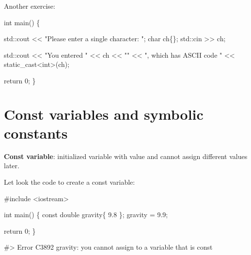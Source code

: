 \documentclass[
  letterpaper,
  DIV=11,
  numbers=noendperiod]{scrreprt}
\newenvironment{Shaded}{\begin{snugshade}}{\end{snugshade}}
\newcommand{\CommentTok}[1]{\textcolor[rgb]{0.37,0.37,0.37}{#1}}
\newcommand{\DecValTok}[1]{\textcolor[rgb]{0.68,0.00,0.00}{#1}}
\newcommand{\ErrorTok}[1]{\textcolor[rgb]{0.68,0.00,0.00}{#1}}
\newcommand{\FloatTok}[1]{\textcolor[rgb]{0.68,0.00,0.00}{#1}}
\newcommand{\FunctionTok}[1]{\textcolor[rgb]{0.28,0.35,0.67}{#1}}
\newcommand{\NormalTok}[1]{\textcolor[rgb]{0.00,0.23,0.31}{#1}}
\newcommand{\OtherTok}[1]{\textcolor[rgb]{0.00,0.23,0.31}{#1}}
\newcommand{\SpecialCharTok}[1]{\textcolor[rgb]{0.37,0.37,0.37}{#1}}
\newcommand{\StringTok}[1]{\textcolor[rgb]{0.13,0.47,0.30}{#1}}
\begin{document}
Another exercise:

\begin{Shaded}
\begin{Highlighting}[]
\NormalTok{int }\FunctionTok{main}\NormalTok{() \{}
    
\NormalTok{    std}\SpecialCharTok{::}\NormalTok{cout }\SpecialCharTok{\textless{}}\ErrorTok{\textless{}} \StringTok{"Please enter a single character: "}\NormalTok{;}
\NormalTok{    char ch\{\};}
\NormalTok{    std}\SpecialCharTok{::}\NormalTok{cin }\SpecialCharTok{\textgreater{}}\ErrorTok{\textgreater{}}\NormalTok{ ch;}

\NormalTok{    std}\SpecialCharTok{::}\NormalTok{cout }\SpecialCharTok{\textless{}}\ErrorTok{\textless{}} \StringTok{"You entered \textquotesingle{}"} \SpecialCharTok{\textless{}}\ErrorTok{\textless{}}\NormalTok{ ch }\SpecialCharTok{\textless{}}\ErrorTok{\textless{}} \StringTok{"\textquotesingle{}"} \SpecialCharTok{\textless{}}\ErrorTok{\textless{}} \StringTok{", which has ASCII code "} \SpecialCharTok{\textless{}}\ErrorTok{\textless{}}\NormalTok{ static\_cast}\SpecialCharTok{\textless{}}\NormalTok{int}\SpecialCharTok{\textgreater{}}\NormalTok{(ch);}

\NormalTok{    return }\DecValTok{0}\NormalTok{;}
\NormalTok{\}}
\end{Highlighting}
\end{Shaded}

\hypertarget{const-variables-and-symbolic-constants}{%
\section{Const variables and symbolic
constants}\label{const-variables-and-symbolic-constants}}

\textbf{Const variable}: initialized variable with value and cannot
assign different values later.

Let look the code to create a const variable:

\begin{Shaded}
\begin{Highlighting}[]
\CommentTok{\#include \textless{}iostream\textgreater{}}

\NormalTok{int }\FunctionTok{main}\NormalTok{()}
\NormalTok{\{}
\NormalTok{    const double gravity\{ }\FloatTok{9.8}\NormalTok{ \};}
\NormalTok{    gravity }\OtherTok{=} \FloatTok{9.9}\NormalTok{;}

\NormalTok{    return }\DecValTok{0}\NormalTok{;}
\NormalTok{\}}

\CommentTok{\#\textgreater{} Error    C3892   \textquotesingle{}gravity\textquotesingle{}: you cannot assign to a variable that is const}
\end{Highlighting}
\end{Shaded}
\end{document}
